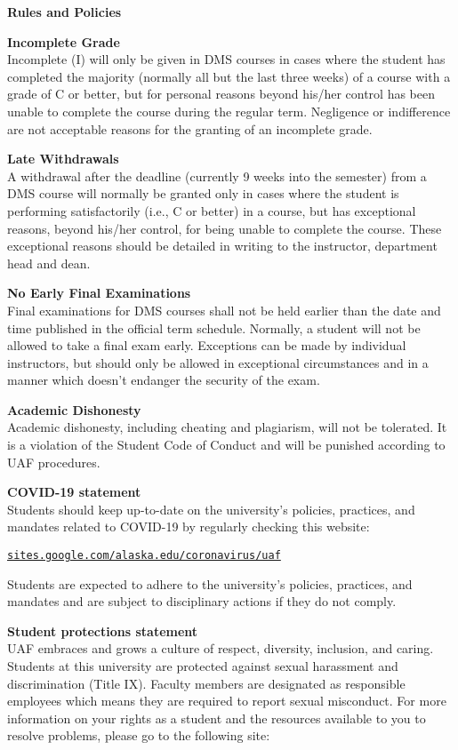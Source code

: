 \documentclass[12pt]{article}
\renewcommand{\emph}[1]{\textsf{\textbf{#1}}}
\newcommand{\localhead}[1]{\par\smallskip\textbf{#1} \smallskip\nobreak\\}%
\def\heading#1{\localhead{\large\emph{#1}}}
\def\subheading#1{\localhead{\emph{#1}}}
\begin{document}
\heading{Rules and Policies}
\vskip -20pt

\subheading{Incomplete Grade} 
Incomplete (I) will only be given in
  DMS courses in cases where
  the student has completed the majority (normally all but the last
  three weeks) of a course with a grade of C or better, but for
  personal reasons beyond his/her control has been unable to complete
  the course during the regular term. Negligence or indifference are
  not acceptable reasons for the granting of an incomplete
  grade. 

\clearpage\newpage
\subheading{Late Withdrawals} 
A withdrawal after the deadline
  (currently 9 weeks into the semester) from a DMS course will
  normally be granted only in cases where the student is performing
  satisfactorily (i.e., C or better) in a course, but has exceptional
  reasons, beyond his/her control, for being unable to complete the
  course. These exceptional reasons should be detailed in writing to
  the instructor, department head and dean.

\subheading{No Early Final Examinations}
Final examinations for DMS
  courses shall not be held earlier than the date and time published
  in the official term schedule. Normally, a student will not be
  allowed to take a final exam early. Exceptions can be made by
  individual instructors, but should only be allowed in exceptional
  circumstances and in a manner which doesn't endanger the security of
  the exam.

\subheading{Academic Dishonesty}
Academic dishonesty, including cheating and plagiarism, will not
be tolerated.  It is a violation of the Student Code of Conduct
and will be punished according to UAF procedures.

 
\subheading{COVID-19 statement}
Students should keep up-to-date on the university's policies, practices, and mandates related to COVID-19 by regularly checking this website:

\href{https://sites.google.com/alaska.edu/coronavirus/uaf?authuser=0}{\texttt{sites.google.com/alaska.edu/coronavirus/uaf}}

Students are expected to adhere to the university's policies, practices, and mandates and are subject to disciplinary actions if they do not comply.

\subheading{Student protections statement}
UAF embraces and grows a culture of respect, diversity, inclusion, and caring. Students at this university are protected against sexual harassment and discrimination (Title IX). Faculty members are designated as responsible employees which means they are required to report sexual misconduct. For more information on your rights as a student and the resources available to you to resolve problems, please go to the following site:
\end{document}
